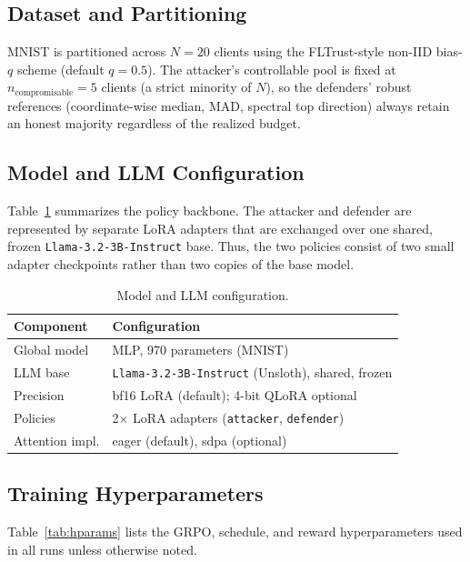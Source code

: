 \documentclass[conference]{IEEEtran}
\begin{document}
\subsection{Dataset and Partitioning}
MNIST is partitioned across $N=20$ clients using the FLTrust-style non-IID bias-$q$ scheme \cite{fltrust} (default $q=0.5$). The attacker's controllable pool is fixed at $n_{\mathrm{compromisable}}=5$ clients (a strict minority of $N$), so the defenders' robust references (coordinate-wise median, MAD, spectral top direction) always retain an honest majority regardless of the realized budget.

\subsection{Model and LLM Configuration}
Table~\ref{tab:llmconfig} summarizes the policy backbone. The attacker and defender are represented by separate LoRA adapters that are exchanged over one shared, frozen \texttt{Llama-3.2-3B-Instruct} base. Thus, the two policies consist of two small adapter checkpoints rather than two copies of the base model.

\begin{table}[t]
\caption{Model and LLM configuration.}
\label{tab:llmconfig}
\centering
\small
\begin{tabular}{@{}ll@{}}
\toprule
\textbf{Component} & \textbf{Configuration} \\
\midrule
Global model & MLP, 970 parameters (MNIST) \\
LLM base & \texttt{Llama-3.2-3B-Instruct} (Unsloth), shared, frozen \\
Precision & bf16 LoRA (default); 4-bit QLoRA optional \cite{qlora2023} \\
Policies & 2$\times$ LoRA adapters (\texttt{attacker}, \texttt{defender}) \\
Attention impl. & eager (default), sdpa (optional) \\
\bottomrule
\end{tabular}
\end{table}

\subsection{Training Hyperparameters}
Table~\ref{tab:hparams} lists the GRPO, schedule, and reward hyperparameters used in all runs unless otherwise noted.
\end{document}
